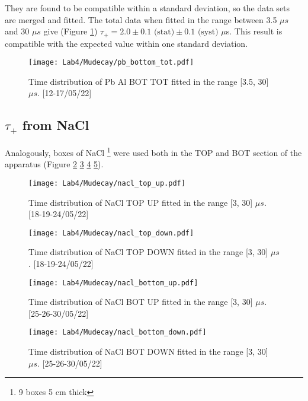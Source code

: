 \documentclass[10pt,a4paper,twocolumn]{article}
\begin{document}
They are found to be compatible within a standard deviation, so the data sets are merged and fitted. The total data when fitted in the range between 3.5 $\mu s$ and 30 $\mu s$ give (Figure \ref{PBALTOT}) $\tau_+=2.0 \pm 0.1 \text{ (stat)} \pm 0.1 \text{ (syst) }\mu$s. This result is compatible with the expected value within one standard deviation. 

\begin{figure}[h!]
\centering
\caption{Time distribution of Pb Al BOT TOT fitted in the range [3.5, 30] $\mu s$. [12-17/05/22]}
\texttt{[image: Lab4/Mudecay/pb\_bottom\_tot.pdf]} 
\label{PBALTOT}
\end{figure}



\subsection{$\tau_+$ from NaCl}


Analogously, boxes of NaCl \footnote{9 boxes 5 cm thick} were used both in the TOP and BOT section of the apparatus (Figure \ref{NACLTOPUP} \ref{NACLTOPDW} \ref{NACLBOTUP} \ref{NACLBOTDW}).

\begin{figure}[h!]
\centering
\caption{Time distribution of NaCl TOP UP fitted in the range [3, 30] $\mu s$. [18-19-24/05/22]}
\texttt{[image: Lab4/Mudecay/nacl\_top\_up.pdf]} 
\label{NACLTOPUP}
\end{figure}

\begin{figure}[h!]
\centering
\caption{Time distribution of NaCl TOP DOWN fitted in the range [3, 30] $\mu s$. [18-19-24/05/22]}
\texttt{[image: Lab4/Mudecay/nacl\_top\_down.pdf]}
\label{NACLTOPDW}
\end{figure}

\begin{figure}[h!]
\centering
\caption{Time distribution of NaCl BOT UP fitted in the range [3, 30] $\mu s$. [25-26-30/05/22]}
\texttt{[image: Lab4/Mudecay/nacl\_bottom\_up.pdf]} 
\label{NACLBOTUP}
\end{figure}

\begin{figure}[h!]
\centering
\caption{Time distribution of NaCl BOT DOWN fitted in the range [3, 30] $\mu s$. [25-26-30/05/22]}
\texttt{[image: Lab4/Mudecay/nacl\_bottom\_down.pdf]} 
\label{NACLBOTDW}
\end{figure}
\end{document}

